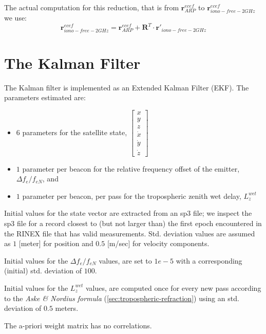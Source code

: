 The actual computation for this reduction, that is from $\bm{r}_{ARP}^{ecef}$ 
to $\bm{r}_{iono-free-2GHz}^{ecef}$ we use:
\begin{equation}
  \bm{r}_{iono-free-2GHz}^{ecef} = \bm{r}_{ARP}^{ecef} + \bm{R}^T \cdot \bm{r}'_{iono-free-2GHz}
\end{equation}

\section{The Kalman Filter}
\label{sec:the-kalman-filter}
The Kalman filter is implemented as an  Extended Kalman Filter (EKF). The parameters 
estimated are:
\begin{itemize} 
  \item $6$ parameters for the satellite state, $\begin{bmatrix} x\\ y\\ z\\ \dot{x}\\ \dot{y}\\ \dot{z}\end{bmatrix}$
  \item $1$ parameter per beacon for the relative frequency offset of the emitter, $\Delta f_{e} / f_{eN}$, and
  \item $1$ parameter per beacon, per pass for the tropospheric zenith wet delay, $L_{z}^{wet}$
\end{itemize}

Initial values for the state vector are extracted from an sp3 file; we inspect 
the sp3 file for a record closest to (but not larger than) the first epoch 
encountered in the RINEX file that has valid measurements. Std. deviation values 
are assumed as $1$ [meter] for position and $0.5$ [m/sec] for velocity components.

Initial values for the $\Delta f_{e} / f_{eN}$ values, are set to $1e-5$ with a 
corresponding (initial) std. deviation of $100$.

Initial values for the $L_{z}^{wet}$ values, are computed once for every new 
pass according to the \textit{Aske \& Nordius formula} (\ref{sec:tropospheric-refraction}) 
using an std. deviation of $0.5$ meters.

The a-priori weight matrix has no correlations.


